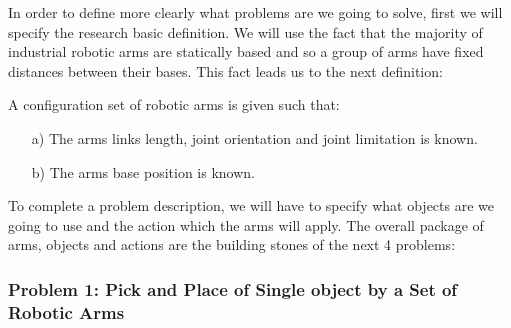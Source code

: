 In order to define more clearly what problems are we going to solve, first we will specify the research basic definition. We will use the fact that the majority of industrial robotic arms are statically based and so a group of arms have fixed distances between their bases. This fact leads us to the next definition:

\begin{definition} \label{def:basic_def}
A configuration set of robotic arms is given such that:
\begin{enumerate}
\item[a)] The arms links length, joint orientation and joint limitation is known.
\item[b)] The arms base position is known.
\end{enumerate}
\end{definition}

To complete a problem description, we will have to specify what objects are we going to use and the action which the arms will apply. The overall package of arms, objects and actions are the building stones of the next 4 problems:

\subsubsection*{Problem 1: Pick and Place of Single object by a Set of Robotic Arms}
 
